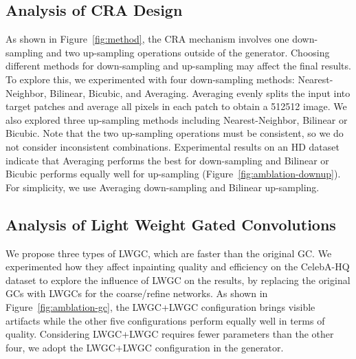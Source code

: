 \documentclass[oribibl]{llncs}  \usepackage[width=122mm,left=12mm,paperwidth=146mm,height=193mm,top=12mm,paperheight=217mm]{geometry}
\begin{document}
\subsection{Analysis of CRA Design}\label{sect:cra}
As shown in Figure~\ref{fig:method}, the CRA mechanism involves one down-sampling and two up-sampling operations outside of the generator. Choosing different methods for down-sampling and up-sampling may affect the final results. To explore this, we experimented with four down-sampling methods: Nearest-Neighbor, Bilinear, Bicubic, and Averaging. Averaging evenly splits the input into target patches and average all pixels in each patch to obtain a 512512 image. We also explored three up-sampling methods including Nearest-Neighbor, Bilinear or Bicubic. Note that the two up-sampling operations must be consistent, so we do not consider inconsistent combinations. Experimental results on an HD dataset indicate that Averaging performs the best for down-sampling and Bilinear or Bicubic performs equally well for up-sampling (Figure~\ref{fig:amblation-downup}). For simplicity, we use Averaging down-sampling and Bilinear up-sampling.

\subsection{Analysis of Light Weight Gated Convolutions}\label{sect:lwgc}
We propose three types of LWGC, which are faster than the original GC. We experimented how they affect inpainting quality and efficiency on the CelebA-HQ dataset to explore the influence of LWGC on the results, by replacing the original GCs with LWGCs for the coarse/refine networks. As shown in Figure~\ref{fig:amblation-gc}, the LWGC+LWGC configuration brings visible artifacts while the other five configurations perform equally well in terms of quality. Considering LWGC+LWGC requires fewer parameters than the other four, we adopt the LWGC+LWGC configuration in the generator.
\end{document}

